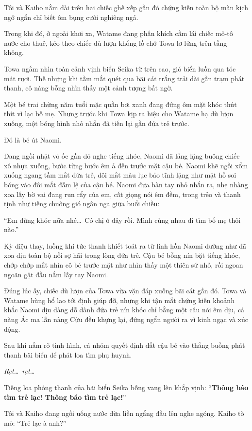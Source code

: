 \documentclass[../main.tex]{subfiles}
\begin{document}
Tôi và Kaiho nằm dài trên hai chiếc ghế xếp gần đó chứng kiến toàn bộ màn kịch ngớ ngẩn chỉ biết ôm bụng cười nghiêng ngả.

Trong khi đó, ở ngoài khơi xa, Watame đang phấn khích cầm lái chiếc mô-tô nước cho thuê, kéo theo chiếc dù lượn khổng lồ chở Towa lơ lửng trên tầng không.

Towa ngắm nhìn toàn cảnh vịnh biển Seika từ trên cao, gió biển luồn qua tóc mát rượi. Thế nhưng khi tầm mắt quét qua bãi cát trắng trải dài gần trạm phát thanh, cô nàng bỗng nhìn thấy một cảnh tượng bất ngờ.

Một bé trai chừng năm tuổi mặc quần bơi xanh đang đứng ôm mặt khóc thút thít vì lạc bố mẹ. Nhưng trước khi Towa kịp ra hiệu cho Watame hạ dù lượn xuống, một bóng hình nhỏ nhắn đã tiến lại gần đứa trẻ trước.

Đó là bé út Naomi.

Đang ngồi nhặt vỏ ốc gần đó nghe tiếng khóc, Naomi đã lẳng lặng buông chiếc xô nhựa xuống, bước từng bước êm ả đến trước mặt cậu bé. Naomi khẽ ngồi xổm xuống ngang tầm mắt đứa trẻ, đôi mắt màu lục bảo tĩnh lặng như mặt hồ soi bóng vào đôi mắt đẫm lệ của cậu bé. Naomi đưa bàn tay nhỏ nhắn ra, nhẹ nhàng xoa lấy bờ vai đang run rẩy của em, cất giọng nói êm đềm, trong trẻo và thanh tịnh như tiếng chuông gió ngân nga giữa buổi chiều:

``Em đừng khóc nữa nhé\dots\ Có chị ở đây rồi. Mình cùng nhau đi tìm bố mẹ thôi nào.''

Kỳ diệu thay, luồng khí tức thanh khiết toát ra từ linh hồn Naomi dường như đã xoa dịu toàn bộ nỗi sợ hãi trong lòng đứa trẻ. Cậu bé bỗng nín bặt tiếng khóc, chớp chớp mắt nhìn cô bé trước mặt như nhìn thấy một thiên sứ nhỏ, rồi ngoan ngoãn gật đầu nắm lấy tay Naomi.

Đúng lúc ấy, chiếc dù lượn của Towa vừa vặn đáp xuống bãi cát gần đó. Towa và Watame hùng hổ lao tới định giúp đỡ, nhưng khi tận mắt chứng kiến khoảnh khắc Naomi dịu dàng dỗ dành đứa trẻ nín khóc chỉ bằng một câu nói êm dịu, cả nàng Ác ma lẫn nàng Cừu đều khựng lại, đứng ngẩn người ra vì kinh ngạc và xúc động.

Sau khi nắm rõ tình hình, cả nhóm quyết định dắt cậu bé vào thẳng buồng phát thanh bãi biển để phát loa tìm phụ huynh.

\textit{Rẹt\dots\ rẹt\dots}

Tiếng loa phóng thanh của bãi biển Seika bỗng vang lên khắp vịnh: ``\textbf{Thông báo tìm trẻ lạc! Thông báo tìm trẻ lạc!}''

Tôi và Kaiho đang ngồi uống nước dừa liền ngẩng đầu lên nghe ngóng. Kaiho tò mò: ``Trẻ lạc à anh?''
\end{document}
